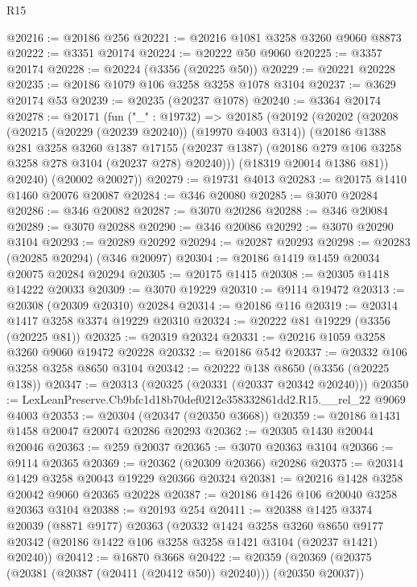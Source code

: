 \begin{lexlean}{R15}
\begin{coremodule}
@20216 := @20186 @256
@20221 := @20216 @1081 @3258 @3260 @9060 @8873
@20222 := @3351 @20174
@20224 := @20222 @50 @9060
@20225 := @3357 @20174
@20228 := @20224 (@3356 (@20225 @50))
@20229 := @20221 @20228
@20235 := @20186 @1079 @106 @3258 @3258 @1078 @3104
@20237 := @3629 @20174 @53
@20239 := @20235 (@20237 @1078)
@20240 := @3364 @20174
@20278 := @20171
    (fun ("_" : @19732) =>
    @20185
      (@20192
        (@20202
          (@20208
            (@20215 (@20229 (@20239 @20240)) (@19970 @4003 @314))
            (@20186
              @1388
              @281
              @3258
              @3260
              @1387
              @17155
              (@20237 @1387)
              (@20186 @279 @106 @3258 @3258 @278 @3104 (@20237 @278) @20240)))
          (@18319 @20014 @1386 @81))
        @20240)
      (@20002 @20027))
@20279 := @19731 @4013
@20283 := @20175 @1410 @1460 @20076 @20087
@20284 := @346 @20080
@20285 := @3070 @20284
@20286 := @346 @20082
@20287 := @3070 @20286
@20288 := @346 @20084
@20289 := @3070 @20288
@20290 := @346 @20086
@20292 := @3070 @20290 @3104
@20293 := @20289 @20292
@20294 := @20287 @20293
@20298 := @20283 (@20285 @20294) (@346 @20097)
@20304 := @20186 @1419 @1459 @20034 @20075 @20284 @20294
@20305 := @20175 @1415
@20308 := @20305 @1418 @14222 @20033
@20309 := @3070 @19229
@20310 := @9114 @19472
@20313 := @20308 (@20309 @20310) @20284
@20314 := @20186 @116
@20319 := @20314 @1417 @3258 @3374 @19229 @20310
@20324 := @20222 @81 @19229 (@3356 (@20225 @81))
@20325 := @20319 @20324
@20331 := @20216 @1059 @3258 @3260 @9060 @19472 @20228
@20332 := @20186 @542
@20337 := @20332 @106 @3258 @3258 @8650 @3104
@20342 := @20222 @138 @8650 (@3356 (@20225 @138))
@20347 := @20313 (@20325 (@20331 (@20337 @20342 @20240)))
@20350 := LexLeanPreserve.Cb9bfc1d18b70def0212e358332861dd2.R15.__rel_22 @9069 @4003
@20353 := @20304 (@20347 (@20350 @3668))
@20359 := @20186 @1431 @1458 @20047 @20074 @20286 @20293
@20362 := @20305 @1430 @20044 @20046
@20363 := @259 @20037
@20365 := @3070 @20363 @3104
@20366 := @9114 @20365
@20369 := @20362 (@20309 @20366) @20286
@20375 := @20314 @1429 @3258 @20043 @19229 @20366 @20324
@20381 := @20216 @1428 @3258 @20042 @9060 @20365 @20228
@20387 := @20186 @1426 @106 @20040 @3258 @20363 @3104
@20388 := @20193 @254
@20411 := @20388
    @1425
    @3374
    @20039
    (@8871 @9177)
    @20363
    (@20332
      @1424
      @3258
      @3260
      @8650
      @9177
      @20342
      (@20186 @1422 @106 @3258 @3258 @1421 @3104 (@20237 @1421) @20240))
@20412 := @16870 @3668
@20422 := @20359 (@20369 (@20375 (@20381 (@20387 (@20411 (@20412 @50)) @20240))) (@20350 @20037))

\end{coremodule}
\end{lexlean}

